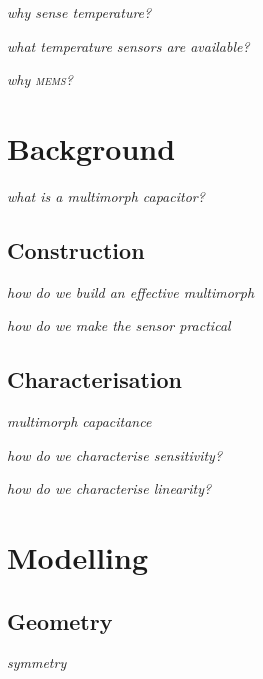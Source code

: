 \documentclass[a4paper,10pt,twocolumn]{article}
\newcommand{\mems}{\textsc{mems}\xspace}
\begin{document}
\emph{why sense temperature?}

\emph{what temperature sensors are available?}

\emph{why \mems?}

\section{Background}

\emph{what is a multimorph capacitor?}

\subsection{Construction}

\emph{how do we build an effective multimorph}

\emph{how do we make the sensor practical}

\subsection{Characterisation}

\emph{multimorph capacitance}

\emph{how do we characterise sensitivity?}

\emph{how do we characterise linearity?}

\section{Modelling}

\subsection{Geometry}

\emph{symmetry}
\end{document}
